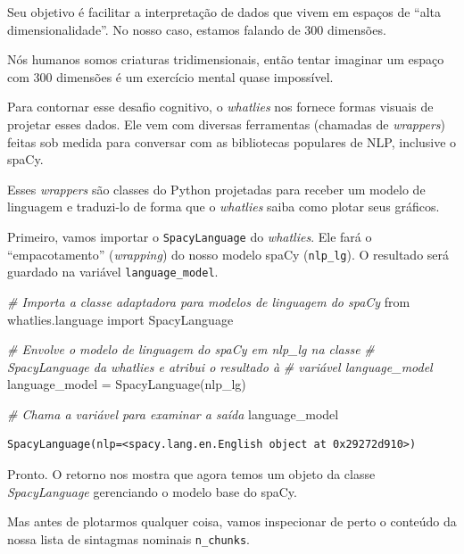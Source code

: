 \documentclass[
  brazilian,
]{article}
\newenvironment{Shaded}{}{}
\newcommand{\CommentTok}[1]{\textcolor[rgb]{0.38,0.63,0.69}{\textit{#1}}}
\newcommand{\ImportTok}[1]{#1}
\newcommand{\NormalTok}[1]{#1}
\newcommand{\OperatorTok}[1]{\textcolor[rgb]{0.40,0.40,0.40}{#1}}
\begin{document}
Seu objetivo é facilitar a interpretação de dados que vivem em espaços
de ``alta dimensionalidade''. No nosso caso, estamos falando de 300
dimensões.

Nós humanos somos criaturas tridimensionais, então tentar imaginar um
espaço com 300 dimensões é um exercício mental quase impossível.

Para contornar esse desafio cognitivo, o \emph{whatlies} nos fornece
formas visuais de projetar esses dados. Ele vem com diversas ferramentas
(chamadas de \emph{wrappers}) feitas sob medida para conversar com as
bibliotecas populares de NLP, inclusive o spaCy.

Esses \emph{wrappers} são classes do Python projetadas para receber um
modelo de linguagem e traduzi-lo de forma que o \emph{whatlies} saiba
como plotar seus gráficos.

Primeiro, vamos importar o \texttt{SpacyLanguage} do \emph{whatlies}.
Ele fará o ``empacotamento'' (\emph{wrapping}) do nosso modelo spaCy
(\texttt{nlp\_lg}). O resultado será guardado na variável
\texttt{language\_model}.

\begin{Shaded}
\begin{Highlighting}[]
\CommentTok{\# Importa a classe adaptadora para modelos de linguagem do spaCy}
\ImportTok{from}\NormalTok{ whatlies.language }\ImportTok{import}\NormalTok{ SpacyLanguage}

\CommentTok{\# Envolve o modelo de linguagem do spaCy em \textquotesingle{}nlp\_lg\textquotesingle{} na classe}
\CommentTok{\# SpacyLanguage da whatlies e atribui o resultado à}
\CommentTok{\# variável \textquotesingle{}language\_model\textquotesingle{}}
\NormalTok{language\_model }\OperatorTok{=}\NormalTok{ SpacyLanguage(nlp\_lg)}

\CommentTok{\# Chama a variável para examinar a saída}
\NormalTok{language\_model}
\end{Highlighting}
\end{Shaded}

\begin{verbatim}
SpacyLanguage(nlp=<spacy.lang.en.English object at 0x29272d910>)
\end{verbatim}

Pronto. O retorno nos mostra que agora temos um objeto da classe
\emph{SpacyLanguage} gerenciando o modelo base do spaCy.

Mas antes de plotarmos qualquer coisa, vamos inspecionar de perto o
conteúdo da nossa lista de sintagmas nominais \texttt{n\_chunks}.
\end{document}
